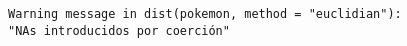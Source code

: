 \documentclass[11pt]{article}
\begin{document}
    \begin{Verbatim}[commandchars=\\\{\}]
Warning message in dist(pokemon, method = "euclidian"):
"NAs introducidos por coerción"
    \end{Verbatim}

    \begin{center}
    \end{center}
    { \hspace*{\fill} \\}
    

    
    
    
\end{document}
